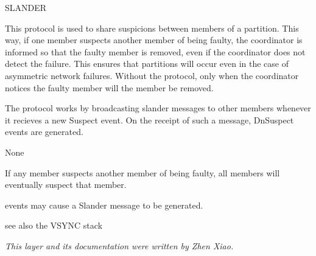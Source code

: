 %
%
%
\begin{Layer}{SLANDER}

This protocol is used to share suspicions between members of a partition.  This
way, if one member suspects another member of being faulty, the coordinator is
informed so that the faulty member is removed, even if the coordinator does not
detect the failure.  This ensures that partitions will occur even in the case
of asymmetric network failures.  Without the protocol, only when the
coordinator notices the faulty member will the member be removed.

\begin{Protocol}
The protocol works by broadcasting slander messages to other members whenever
it recieves a new Suspect event.  On the receipt of such a message, DnSuspect
events are generated.
\end{Protocol}

\begin{Parameters}
\item None
\end{Parameters} 

\begin{Properties}
\item
If any member suspects another member of being faulty, all members will
eventually suspect that member.
\item
{} events may cause a Slander message to be generated.
\end{Properties}

\begin{Sources}
\end{Sources}

\begin{GenEvent}
\end{GenEvent}

\begin{Testing}
\item
see also the VSYNC stack
\end{Testing}

\emph{This layer and its documentation were written by Zhen Xiao.}
\end{Layer}
